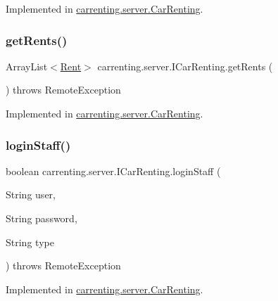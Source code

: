 Implemented in \mbox{\hyperlink{classcarrenting_1_1server_1_1_car_renting_a65886cbac0c23f1dd39c1b2bf5daec25}{carrenting.\+server.\+Car\+Renting}}.

\mbox{\label{interfacecarrenting_1_1server_1_1_i_car_renting_a314ae8f7230cca5469932eb3034d5c49}} 
\subsubsection{\texorpdfstring{getRents()}{getRents()}}
{\footnotesize\ttfamily Array\+List$<$\mbox{\hyperlink{classcarrenting_1_1server_1_1jdo_1_1_rent}{Rent}}$>$ carrenting.\+server.\+I\+Car\+Renting.\+get\+Rents (\begin{DoxyParamCaption}{ }\end{DoxyParamCaption}) throws Remote\+Exception}



Implemented in \mbox{\hyperlink{classcarrenting_1_1server_1_1_car_renting_aa888e82a1c7d54b10c1e2d8b02b5a363}{carrenting.\+server.\+Car\+Renting}}.

\mbox{\label{interfacecarrenting_1_1server_1_1_i_car_renting_affb9a568ddfe7cd2712f367c38e0e432}} 
\subsubsection{\texorpdfstring{loginStaff()}{loginStaff()}}
{\footnotesize\ttfamily boolean carrenting.\+server.\+I\+Car\+Renting.\+login\+Staff (\begin{DoxyParamCaption}\item[{String}]{user,  }\item[{String}]{password,  }\item[{String}]{type }\end{DoxyParamCaption}) throws Remote\+Exception}



Implemented in \mbox{\hyperlink{classcarrenting_1_1server_1_1_car_renting_a99b2a341e48a7270ae5ee51d8ac4414c}{carrenting.\+server.\+Car\+Renting}}.

